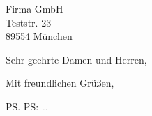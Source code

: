 \documentclass[absender]{scrlttr2}
\begin{document}
\begin{letter}{
    Firma GmbH\\%
    Teststr. 23\\%
    89554 München 
}

\KOMAoptions{
}



\opening{Sehr geehrte Damen und Herren,}

\Blindtext[4][1]

\closing{Mit freundlichen Grüßen,}

\ps PS: \dots



\end{letter}
\end{document}
